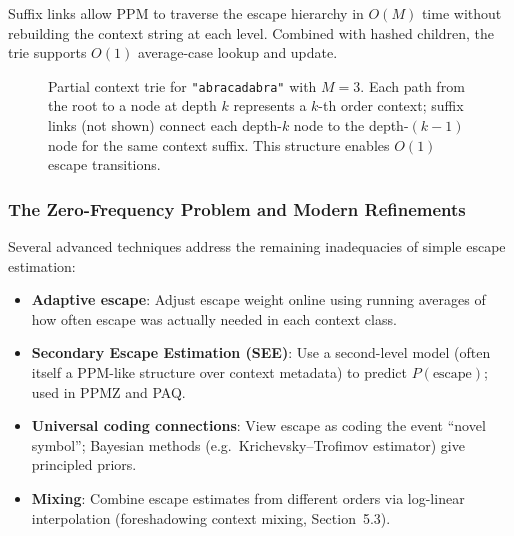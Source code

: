 Suffix links allow PPM to traverse the escape hierarchy in $O(M)$ time without
rebuilding the context string at each level. Combined with hashed children, the trie
supports $O(1)$ average-case lookup and update.

\begin{figure}[h]
\centering
{}
\caption{Partial context trie for \texttt{"abracadabra"} with $M=3$. Each path from
the root to a node at depth $k$ represents a $k$-th order context; suffix links
(not shown) connect each depth-$k$ node to the depth-$(k-1)$ node for the same
context suffix. This structure enables $O(1)$ escape transitions.}
\label{fig:context-trie}
\end{figure}

\subsubsection{The Zero-Frequency Problem and Modern Refinements}

Several advanced techniques address the remaining inadequacies of simple escape
estimation:
\begin{itemize}
    \item \textbf{Adaptive escape}: Adjust escape weight online using running averages
          of how often escape was actually needed in each context class.
    \item \textbf{Secondary Escape Estimation (SEE)}: Use a second-level model (often
          itself a PPM-like structure over context metadata) to predict
          $P(\text{escape})$; used in PPMZ and PAQ.
    \item \textbf{Universal coding connections}: View escape as coding the event
          ``novel symbol''; Bayesian methods (e.g.\ Krichevsky--Trofimov estimator)
          give principled priors.
    \item \textbf{Mixing}: Combine escape estimates from different orders via
          log-linear interpolation (foreshadowing context mixing, Section~5.3).
\end{itemize}

